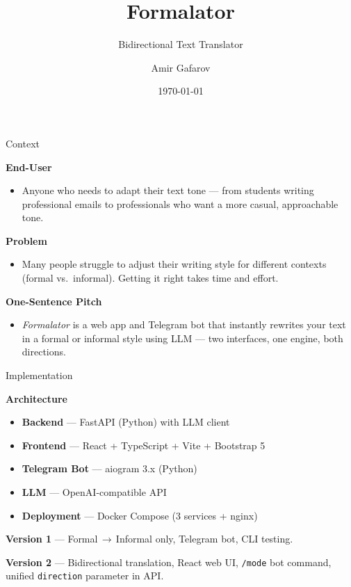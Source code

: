 \documentclass[11pt]{beamer}
\title{Formalator}
\subtitle{Bidirectional Text Translator}
\author{Amir Gafarov}
\institute{
    a.gafarov@innopolis.university \\
    CSE-03
}
\date{\today}
\begin{document}
\begin{frame}
    \titlepage
\end{frame}

\begin{frame}{Context}

    \vspace{0.3cm}
    \textbf{End-User}
    \begin{itemize}
        \item Anyone who needs to adapt their text tone — from students writing professional emails to professionals who want a more casual, approachable tone.
    \end{itemize}

    \vspace{0.3cm}
    \textbf{Problem}
    \begin{itemize}
        \item Many people struggle to adjust their writing style for different contexts (formal vs.\ informal). Getting it right takes time and effort.
    \end{itemize}

    \vspace{0.3cm}
    \textbf{One-Sentence Pitch}
    \begin{itemize}
        \item \textit{Formalator} is a web app and Telegram bot that instantly rewrites your text in a formal or informal style using LLM — two interfaces, one engine, both directions.
    \end{itemize}

\end{frame}

\begin{frame}{Implementation}

    \textbf{Architecture}
    \begin{itemize}
        \item \textbf{Backend} — FastAPI (Python) with LLM client
        \item \textbf{Frontend} — React + TypeScript + Vite + Bootstrap 5
        \item \textbf{Telegram Bot} — aiogram 3.x (Python)
        \item \textbf{LLM} — OpenAI-compatible API
        \item \textbf{Deployment} — Docker Compose (3 services + nginx)
    \end{itemize}

    \vspace{0.3cm}
    \textbf{Version 1} — Formal$\,\rightarrow\,$Informal only, Telegram bot, CLI testing.

    \vspace{0.3cm}
    \textbf{Version 2} — Bidirectional translation, React web UI, \texttt{/mode} bot command, unified \texttt{direction} parameter in API.

\end{frame}
\end{document}

